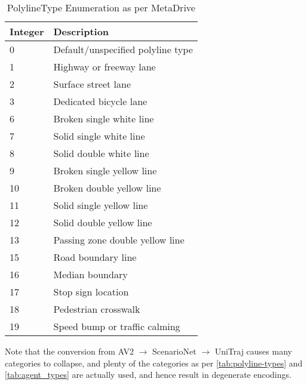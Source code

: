 \begin{table}[H]
\centering
\caption{PolylineType Enumeration as per MetaDrive}
\label{tab:polyline-types}
\begin{tabular}{p{2cm}p{11cm}}
\toprule
\textbf{Integer} & \textbf{Description} \\
\midrule
0 & Default/unspecified polyline type \\
1 & Highway or freeway lane \\
2 & Surface street lane \\
3 & Dedicated bicycle lane \\
6 & Broken single white line \\
7 & Solid single white line \\
8 & Solid double white line \\
9 & Broken single yellow line \\
10 & Broken double yellow line \\
11 & Solid single yellow line \\
12 & Solid double yellow line \\
13 & Passing zone double yellow line \\
15 & Road boundary line \\
16 & Median boundary \\
17 & Stop sign location \\
18 & Pedestrian crosswalk \\
19 & Speed bump or traffic calming \\
\bottomrule
\end{tabular}
\end{table}

Note that the conversion from AV2 \( \rightarrow \) ScenarioNet \( \rightarrow \) UniTraj causes many categories to collapse, and plenty of the categories as per \autoref{tab:polyline-types} and  \autoref{tab:agent_types} are actually used, and hence result in degenerate encodings.